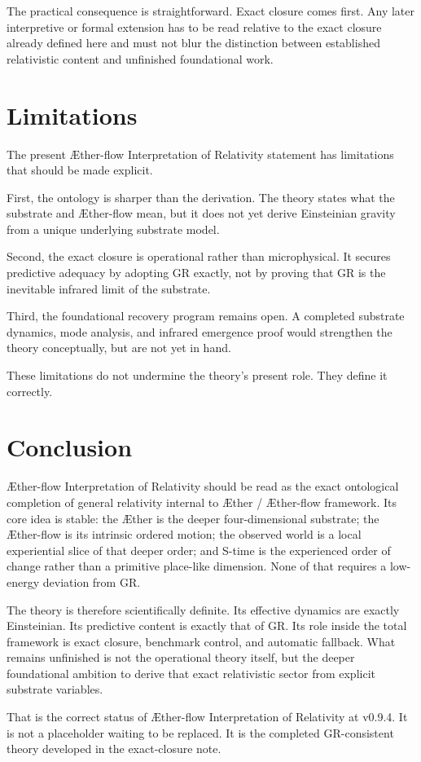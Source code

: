 \documentclass[11pt]{article}
\newcommand{\Aether}{\AE{}ther}
\newcommand{\Aflow}{\AE{}ther-flow}
\newcommand{\TheoryName}{\Aflow{} Interpretation of Relativity}
\newcommand{\TheoryProgram}{\Aether{} / \Aflow{} framework}
\begin{document}
The practical consequence is straightforward. Exact closure comes first. Any later interpretive or formal extension has to be read relative to the exact closure already defined here and must not blur the distinction between established relativistic content and unfinished foundational work.

\section{Limitations}

The present \TheoryName{} statement has limitations that should be made explicit.

First, the ontology is sharper than the derivation. The theory states what the substrate and \Aflow{} mean, but it does not yet derive Einsteinian gravity from a unique underlying substrate model.

Second, the exact closure is operational rather than microphysical. It secures predictive adequacy by adopting GR exactly, not by proving that GR is the inevitable infrared limit of the substrate.

Third, the foundational recovery program remains open. A completed substrate dynamics, mode analysis, and infrared emergence proof would strengthen the theory conceptually, but are not yet in hand.

These limitations do not undermine the theory's present role. They define it correctly.

\section{Conclusion}

\TheoryName{} should be read as the exact ontological completion of general relativity internal to \TheoryProgram{}. Its core idea is stable: the \Aether{} is the deeper four-dimensional substrate; the \Aflow{} is its intrinsic ordered motion; the observed world is a local experiential slice of that deeper order; and S-time is the experienced order of change rather than a primitive place-like dimension. None of that requires a low-energy deviation from GR.

The theory is therefore scientifically definite. Its effective dynamics are exactly Einsteinian. Its predictive content is exactly that of GR. Its role inside the total framework is exact closure, benchmark control, and automatic fallback. What remains unfinished is not the operational theory itself, but the deeper foundational ambition to derive that exact relativistic sector from explicit substrate variables.

That is the correct status of \TheoryName{} at v0.9.4. It is not a placeholder waiting to be replaced. It is the completed GR-consistent theory developed in the exact-closure note.
\end{document}
